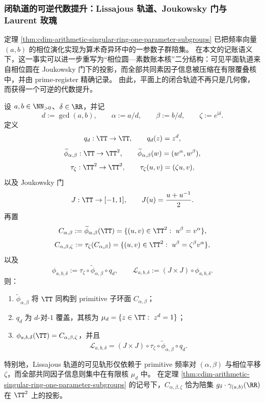 \subsubsection{闭轨道的可逆代数提升：Lissajous 轨道、Joukowsky 门与 Laurent 玫瑰}\label{subsubsec:cdim-lissajous-joukowsky-prime-register-lift}
定理 \ref{thm:cdim-arithmetic-singular-ring-one-parameter-subgroups} 已把频率向量 \((a,b)\) 的相位演化实现为算术奇异环中的一参数子群陪集。
在本文的记账语义下，这一事实可以进一步重写为“相位圆—素数账本核”二分结构：可见平面轨道来自相位圆在 Joukowsky 门下的投影，而全部共同素因子信息被压缩在有限覆叠核中，并由 prime-register 精确记录。
由此，平面上的闭合轨迹不再只是几何像，而获得一个可逆的代数提升。

\begin{theorem}\label{thm:cdim-lissajous-phase-circle-prime-ledger-kernel}
设 \(a,b\in\NN_{>0}\)、\(\delta\in\RR\)，并记
\[
d:=\gcd(a,b),\qquad \alpha:=a/d,\qquad \beta:=b/d,\qquad \zeta:=e^{\mathrm{i}\delta}.
\]
定义
\[
q_d:\TT\to\TT,\qquad q_d(z)=z^d,
\]
\[
\widetilde\phi_{\alpha,\beta}:\TT\to\TT^2,\qquad \widetilde\phi_{\alpha,\beta}(w)=(w^\alpha,w^\beta),
\]
\[
\tau_\zeta:\TT^2\to\TT^2,\qquad \tau_\zeta(u,v)=(\zeta u,v),
\]
以及 Joukowsky 门
\[
J:\TT\to[-1,1],\qquad J(u)=\frac{u+u^{-1}}{2}.
\]
再置
\[
C_{\alpha,\beta}:=\widetilde\phi_{\alpha,\beta}(\TT)
=\{(u,v)\in\TT^2:\ u^\beta=v^\alpha\},
\]
\[
C_{\alpha,\beta,\zeta}:=\tau_\zeta(C_{\alpha,\beta})
=\{(u,v)\in\TT^2:\ u^\beta=\zeta^\beta v^\alpha\},
\]
以及
\[
\phi_{a,b,\delta}:=\tau_\zeta\circ \widetilde\phi_{\alpha,\beta}\circ q_d,
\qquad
\mathcal L_{a,b,\delta}:=(J\times J)\circ \phi_{a,b,\delta}.
\]
则：
\begin{enumerate}
  \item \(\widetilde\phi_{\alpha,\beta}\) 将 \(\TT\) 同构到 primitive 子环面 \(C_{\alpha,\beta}\)；
  \item \(q_d\) 为 \(d\)-对-\(1\) 覆盖，其核为 \(\mu_d=\{z\in\TT:\ z^d=1\}\)；
  \item \(\phi_{a,b,\delta}(\TT)=C_{\alpha,\beta,\zeta}\)，并且
  \[
  \mathcal L_{a,b,\delta}
  =(J\times J)\circ \tau_\zeta\circ \widetilde\phi_{\alpha,\beta}\circ q_d.
  \]
\end{enumerate}
特别地，Lissajous 轨道的可见轨形仅依赖于 primitive 频率对 \((\alpha,\beta)\) 与相位平移 \(\zeta\)，而全部共同因子信息则集中在有限核 \(\mu_d\) 中。
在定理 \ref{thm:cdim-arithmetic-singular-ring-one-parameter-subgroups} 的记号下，\(C_{\alpha,\beta,\zeta}\) 恰为陪集 \(g_\delta\cdot\gamma_{(a,b)}(\RR)\) 在 \(\TT^2\) 上的投影。
\end{theorem}
